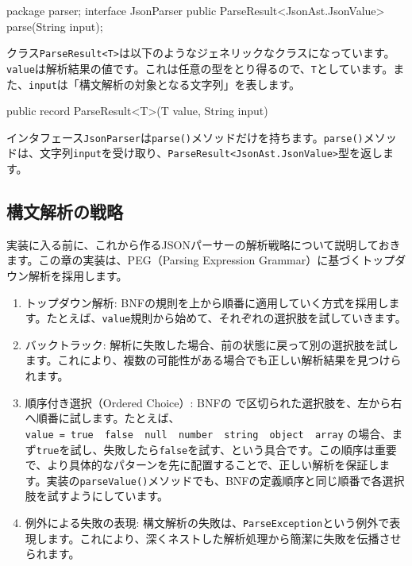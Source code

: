 \begin{codescreen}{}
package parser;
interface JsonParser {
    public ParseResult<JsonAst.JsonValue> parse(String input);
}
\end{codescreen}

クラス\texttt{ParseResult\textless{}T\textgreater{}}は以下のようなジェネリックなクラスになっています。\texttt{value}は解析結果の値です。これは任意の型をとり得るので、\texttt{T}としています。また、\texttt{input}は「構文解析の対象となる文字列」を表します。

\begin{codescreen}{}
public record ParseResult<T>(T value, String input) {}
\end{codescreen}

インタフェース\texttt{JsonParser}は\texttt{parse()}メソッドだけを持ちます。\texttt{parse()}メソッドは、文字列\texttt{input}を受け取り、\texttt{ParseResult\textless{}JsonAst.JsonValue\textgreater{}}型を返します。

\subsection{構文解析の戦略}

実装に入る前に、これから作るJSONパーサーの解析戦略について説明しておきます。この章の実装は、PEG（Parsing
Expression Grammar）に基づくトップダウン解析を採用します。

\begin{enumerate}
\item
  トップダウン解析:
  BNFの規則を上から順番に適用していく方式を採用します。たとえば、\texttt{value}規則から始めて、それぞれの選択肢を試していきます。
\item
  バックトラック:
  解析に失敗した場合、前の状態に戻って別の選択肢を試します。これにより、複数の可能性がある場合でも正しい解析結果を見つけられます。
\item
  順序付き選択（Ordered Choice）: BNFの \texttt{\textbar{}}
  で区切られた選択肢を、左から右へ順番に試します。たとえば、\texttt{value\ =\ true\ \textbar{}\ false\ \textbar{}\ null\ \textbar{}\ number\ \textbar{}\ string\ \textbar{}\ object\ \textbar{}\ array}
  の場合、まず\texttt{true}を試し、失敗したら\texttt{false}を試す、という具合です。この順序は重要で、より具体的なパターンを先に配置することで、正しい解析を保証します。実装の\texttt{parseValue()}メソッドでも、BNFの定義順序と同じ順番で各選択肢を試すようにしています。
\item
  例外による失敗の表現:
  構文解析の失敗は、\texttt{ParseException}という例外で表現します。これにより、深くネストした解析処理から簡潔に失敗を伝播させられます。
\end{enumerate}

